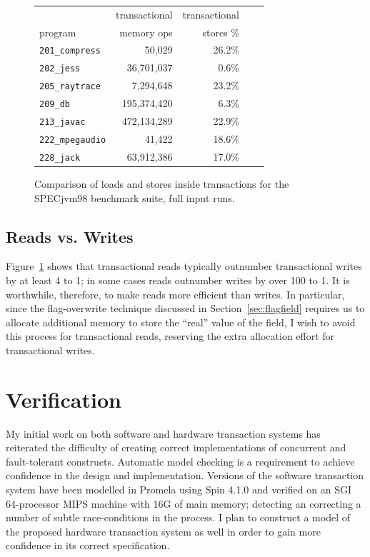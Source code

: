 \documentclass[12pt,twoside]{article}
\newcommand{\punt}[1]{}%
\newcommand{\sis}{\linespread{1.0}\setlength{\baselineskip}{0.8\baselineskip}}
\newcommand{\figref}[1]         {Figure~\ref{fig:#1}}
\newcommand{\secref}[1]         {Section~\ref{sec:#1}}
\begin{document}
\begin{figure}\sis%
\begin{center}
\begin{tabular}{lrrrr}
        & transactional & transactional\\
program & memory ops    & stores \% \\\hline
{\tt 201\_compress} & 50,029 & 26.2\% \\
{\tt 202\_jess} & 36,701,037 & 0.6\% \\
{\tt 205\_raytrace} & 7,294,648 & 23.2\% \\
{\tt 209\_db} & 195,374,420 & 6.3\% \\
{\tt 213\_javac} & 472,134,289 & 22.9\% \\
{\tt 222\_mpegaudio} & 41,422 & 18.6\% \\
{\tt 228\_jack} & 63,912,386 & 17.0\% \\
\end{tabular}
\end{center}
\caption{Comparison of loads and stores inside transactions for the
  SPECjvm98 benchmark suite, full input runs.}
\label{fig:writepercent}
\end{figure}
\subsection{Reads vs. Writes}
\figref{writepercent} shows that transactional reads typically
outnumber transactional writes by at least 4 to 1; in some cases reads
outnumber writes by over 100 to 1.  It is worthwhile, therefore, to
make reads more efficient than writes.  In particular, since the
flag-overwrite technique discussed in \secref{flagfield} requires us
to allocate additional memory to store the ``real'' value of the
field, I wish to avoid this process for transactional reads,
reserving the extra allocation effort for transactional writes.

\punt{
\subsection{Large objects}
See \secref{properties}.
}

\section{Verification}
My initial work on both software and hardware transaction systems has
reiterated the difficulty of creating correct implementations of
concurrent and fault-tolerant constructs.  Automatic model checking is
a requirement to achieve confidence in the design and implementation.
Versions of the software transaction system have been modelled in
Promela using Spin 4.1.0 and verified on an SGI 64-processor MIPS
machine with 16G of main memory; detecting an correcting a number of
subtle race-conditions in the process.  I plan to construct a model of
the proposed hardware transaction system as well in order to gain more
confidence in its correct specification.
\end{document}

